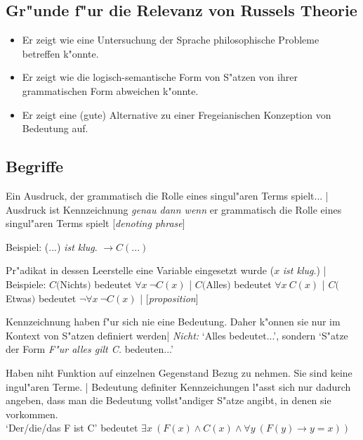 \documentclass[emulatestandardclasses]{scrartcl}
\begin{document}
\subsection{Gr"unde f"ur die Relevanz von Russels Theorie}
\begin{itemize}
  \item Er zeigt wie eine Untersuchung der Sprache philosophische Probleme betreffen k"onnte.
  \item Er zeigt wie die logisch-semantische Form von S"atzen von ihrer grammatischen Form abweichen k"onnte.
  \item Er zeigt eine (gute) Alternative zu einer Fregeianischen Konzeption von Bedeutung auf.
\end{itemize}

\subsection{Begriffe}

\begin{description}[leftmargin=!,labelwidth=\widthof{\bfseries Gebrauchsdefinition}]
    \item[Kennzeichnung] Ein Ausdruck, der grammatisch die Rolle eines singul"aren Terms spielt... | Ausdruck ist Kennzeichnung \emph{genau dann wenn} er grammatisch die Rolle eines singul"aren Terms spielt [\emph{denoting phrase}]
    \item[Pr"adikat] Beispiel: (...) \emph{ist klug}. $\rightarrow C(...)$
    \item[Aussage] Pr"adikat in dessen Leerstelle eine Variable eingesetzt wurde ($x$ \emph{ist klug}.) | Beispiele: $C($Nichts$)$ bedeutet $\forall x~\neg C(x)$ | $C($Alles$)$ bedeutet $\forall x~C(x)$ | $C($Etwas$)$ bedeutet $\neg \forall x~\neg C(x)$ | [\emph{proposition}]
    \item[Gebrauchsdefinition] Kennzeichnung haben f"ur sich nie eine Bedeutung. Daher k"onnen sie nur im Kontext von S"atzen definiert werden| \emph{Nicht:} `Alles bedeutet...', sondern `S"atze der Form \emph{F"ur alles gilt C.} bedeuten...'  
    \item[Definite Kennz.]Haben niht Funktion auf einzelnen Gegenstand Bezug zu nehmen. Sie sind keine ingul"aren Terme. | Bedeutung definiter Kennzeichungen l"asst sich nur dadurch angeben, dass man die Bedeutung vollst"andiger S"atze angibt, in denen sie vorkommen.\\`Der/die/das F ist C' bedeutet $\exists x~(F(x) \wedge C(x) \wedge \forall y~(F(y) \rightarrow y = x) )$
    \item[Extension] 
    \item[Intension] 
\end{description}
\end{document}

